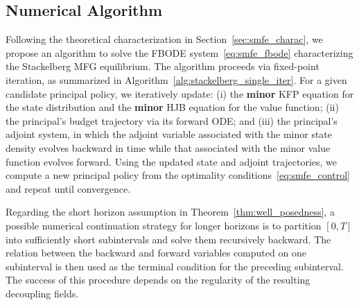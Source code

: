 \documentclass[letterpaper, 10 pt, conference]{ieeeconf}  %
\begin{document}
\subsection{Numerical Algorithm}
\label{sec:numerical_algo}
Following the theoretical characterization in Section~\ref{sec:smfe_charac}, we propose an algorithm to solve the FBODE system~\eqref{eq:smfe_fbode} characterizing the Stackelberg MFG equilibrium. The algorithm proceeds via fixed-point iteration, as summarized in Algorithm~\ref{alg:stackelberg_single_iter}. For a given candidate principal policy, we iteratively update: (i) the \textbf{minor} KFP equation for the state distribution and the \textbf{minor} HJB equation for the value function; (ii) the principal's budget trajectory via its forward ODE; and (iii) the principal's adjoint system, in which the adjoint variable associated with the minor state density evolves backward in time while that associated with the minor value function evolves forward. Using the updated state and adjoint trajectories, we compute a new principal policy from the optimality conditions~\eqref{eq:smfe_control} and repeat until convergence.

Regarding the short horizon assumption in Theorem~\ref{thm:well_posedness}, a possible numerical continuation strategy for longer horizons is to partition $[0,T]$ into sufficiently short subintervals and solve them recursively backward. The relation between the backward and forward variables computed on one subinterval is then used as the terminal condition for the preceding subinterval. The success of this procedure depends on the regularity of the resulting decoupling fields.
\end{document}
